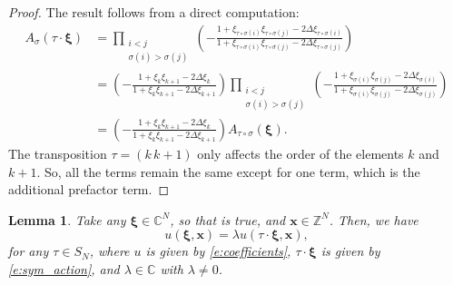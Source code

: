\documentclass[a4paper,11pt]{article}
\newtheorem{lemma}[theorem]{Lemma}
\theoremstyle{definition}
\begin{document}
\begin{proof}
    The result follows from a direct computation:
    \begin{equation}
        \begin{split}
        A_{\sigma} (\tau \cdot \boldsymbol{\xi}) &= \prod_{\substack{i < j \\ \sigma(i)> \sigma(j)}}\left(- \frac{1 + \xi_{\tau \circ \sigma (i)}\xi_{\tau \circ \sigma (j)} - 2 \Delta \xi_{\tau \circ \sigma (i)}}{1 + \xi_{\tau \circ \sigma (i)}\xi_{\tau \circ \sigma (j)} - 2 \Delta \xi_{\tau \circ \sigma (j)}} \right)\\
        &= \left(-\frac{1 + \xi_k \xi_{k+1} - 2 \Delta \xi_k}{1 + \xi_k \xi_{k+1} - 2 \Delta \xi_{k+1}}\right) \prod_{\substack{i < j \\ \sigma(i)> \sigma(j)}}\left(- \frac{1 + \xi_{ \sigma (i)}\xi_{ \sigma (j)} - 2 \Delta \xi_{ \sigma (i)}}{1 + \xi_{ \sigma (i)}\xi_{ \sigma (j)} - 2 \Delta \xi_{ \sigma (j)}} \right)\\
        &= \left(-\frac{1 + \xi_k \xi_{k+1} - 2 \Delta \xi_k}{1 + \xi_k \xi_{k+1} - 2 \Delta \xi_{k+1}}\right) A_{\tau \circ \sigma}(\boldsymbol{\xi}).
        \end{split}
    \end{equation}
    The transposition $\tau = (k \, k+1)$ only affects the order of the elements $k$ and $k+1$. So, all the terms remain the same except for one term, which is the additional prefactor term.
\end{proof}

\begin{lemma}\label{l:well_def}
Take any $\boldsymbol{\xi} \in \mathbb{C}^N$, so that  is true, and $\mathbf{x}\in \mathbb{Z}^N$. Then, we have
    \begin{equation}
    u(\boldsymbol{\xi}, \mathbf{x}) = \lambda u(\tau \cdot \boldsymbol{\xi}, \mathbf{x}),
    \end{equation}
for any $\tau \in S_N$, where $u$ is given by \eqref{e:coefficients}, $\tau \cdot \boldsymbol{\xi}$ is given by \eqref{e:sym_action}, and $\lambda \in \mathbb{C}$ with $\lambda \neq 0$.
\end{lemma}
\end{document}
